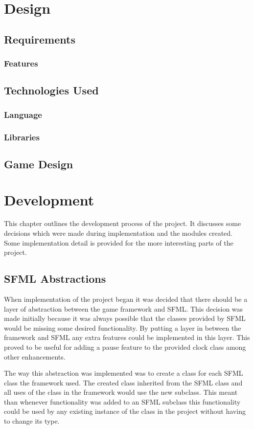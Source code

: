 \documentclass[]{report}
\begin{document}
\chapter{Design}
	\section{Requirements}
		\subsection{Features}
	\section{Technologies Used}
		\subsection{Language}
		\subsection{Libraries}
	\section{Game Design}


\chapter{Development}
This chapter outlines the development process of the project. It discusses some decisions which were made during implementation and the modules created. Some implementation detail is provided for the more interesting parts of the project.

	\section{SFML Abstractions}
	When implementation of the project began it was decided that there should be a layer of abstraction between the game framework and SFML. This decision was made initially because it was always possible that the classes provided by SFML would be missing some desired functionality. By putting a layer in between the framework and SFML any extra features could be implemented in this layer. This proved to be useful for adding a pause feature to the provided clock class among other enhancements.
	
	The way this abstraction was implemented was to create a class for each SFML class the framework used. The created class inherited from the SFML class and all uses of the class in the framework would use the new subclass. This meant than whenever functionality was added to an SFML subclass this functionality could be used by any existing instance of the class in the project without having to change its type.
	
\end{document}
